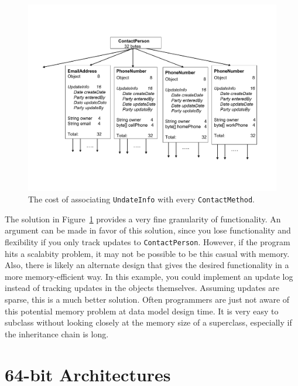 \begin{figure}
  \centering
 \includegraphics[width=.70\textwidth]{Figures/chapter4/big-base-class.pdf}
  \caption{The cost of associating \texttt{UndateInfo} with every \texttt{ContactMethod}.}
  \label{fig:big-base-class}
\end{figure}
 
The solution in Figure~\ref{fig:big-base-class} provides a very fine granularity of functionality. An argument can be made in favor of this solution, since you lose functionality and flexibility if you only track updates to \texttt{ContactPerson}. However, if the program hits a scalabity problem, it may not be possible to be this casual with memory. Also, there is likely an alternate design that gives the desired functionality in a more memory-efficient way. In this example, you could implement an update log instead of tracking updates in the objects themselves. Assuming updates are sparse, this is a much better solution. Often programmers are just not aware of this potential memory problem at data model design time. It is very easy to subclass without looking closely at the memory size of a superclass, especially if the inheritance chain is long.   

\section{64-bit Architectures}

